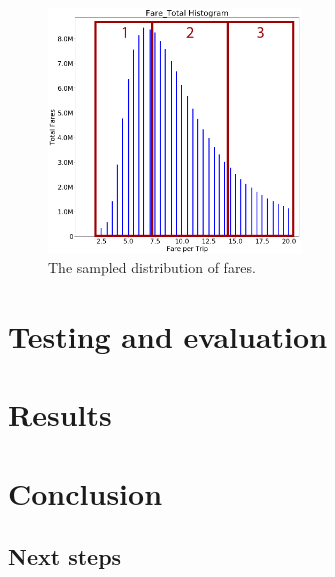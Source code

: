 \documentclass[a4paper]{article}
\begin{document}
\begin{figure}
  \centering
  \includegraphics[width=0.6\textwidth]{images/distribution-fares-sampled.png}
  \caption{The sampled distribution of fares.}
  \label{fig:distribution-fares-sampled}
\end{figure}


\section{Testing and evaluation}

\section{Results}

\section{Conclusion}
\subsection{Next steps}
\end{document}
